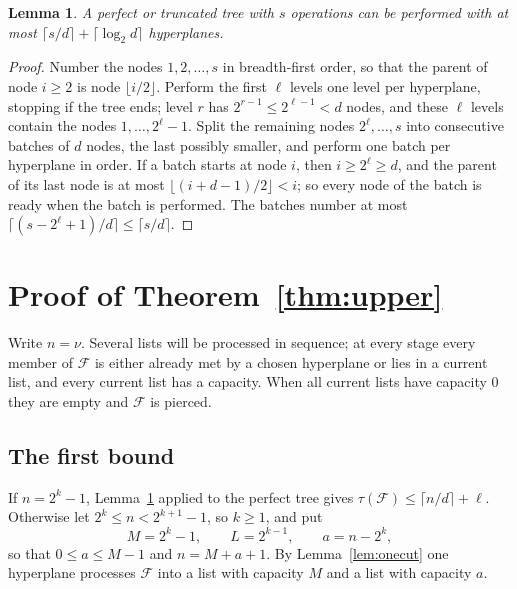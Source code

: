 \documentclass[11pt]{amsart}
\newtheorem{lemma}[theorem]{Lemma}
\theoremstyle{remark}
\newcommand{\F}{\mathcal F}
\newcommand{\ceil}[1]{\lceil #1\rceil}
\newcommand{\floor}[1]{\lfloor #1\rfloor}
\begin{document}
\begin{lemma}\label{lem:schedule}
A perfect or truncated tree with $s$ operations can be performed with at most $\ceil{s/d}+\ceil{\log_2 d}$ hyperplanes.
\end{lemma}

\begin{proof}
Number the nodes $1,2,\dots,s$ in breadth-first order, so that the parent of node $i\ge2$
is node $\floor{i/2}$. Perform the first $\ell$ levels one level per hyperplane, stopping if the tree ends; level $r$
has $2^{r-1}\le 2^{\ell-1}<d$ nodes, and these $\ell$ levels contain the nodes $1,\dots,2^\ell-1$. Split the remaining
nodes $2^\ell,\dots,s$ into consecutive batches of $d$ nodes, the last possibly smaller, and perform one batch per
hyperplane in order. If a batch starts at node $i$, then $i\ge2^\ell\ge d$, and the parent of its last node is at most
$\floor{(i+d-1)/2}<i$; so every node of the batch is ready when the batch is performed. The batches number at most
$\ceil{(s-2^\ell+1)/d}\le\ceil{s/d}$.
\end{proof}

\section{Proof of Theorem~\ref{thm:upper}}\label{sec:proof}

Write $n=\nu$. Several lists will be processed in sequence; at every stage every member of
$\F$ is either already met by a chosen hyperplane or lies in a current list, and every current list has a capacity.
When all current lists have capacity $0$ they are empty and $\F$ is pierced.

\subsection*{The first bound}
If $n=2^k-1$, Lemma~\ref{lem:schedule} applied to the perfect tree gives $\tau(\F)\le\ceil{n/d}+\ell$. Otherwise let
$2^k\le n<2^{k+1}-1$, so $k\ge1$, and put
\[
M=2^k-1,\qquad L=2^{k-1},\qquad a=n-2^k,
\]
so that $0\le a\le M-1$ and $n=M+a+1$. By Lemma~\ref{lem:onecut} one hyperplane processes $\F$ into a list with
capacity $M$ and a list with capacity $a$.
\end{document}
